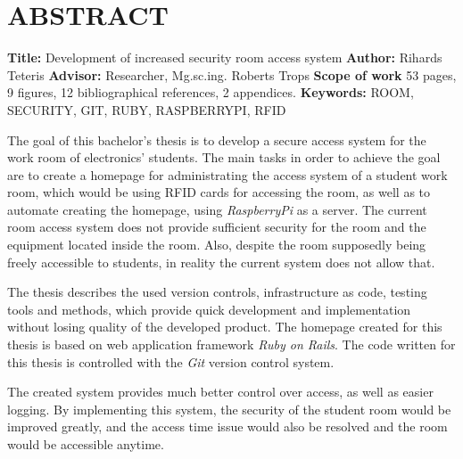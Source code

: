 \chapter*{ABSTRACT}
\noindent \textbf{Title:} Development of increased security room access system\newline
\textbf{Author:} Rihards Teteris\newline
\textbf{Advisor:} Researcher, Mg.sc.ing. Roberts Trops\newline
\textbf{Scope of work} 53 pages, 9 figures, 12 bibliographical references, 2 appendices.\newline
\textbf{Keywords:} ROOM, SECURITY, GIT, RUBY, RASPBERRYPI, RFID\newline

The goal of this bachelor's thesis is to develop a secure access system for the work room of  electronics' students.
The main tasks in order to achieve the goal are to create a homepage for administrating the access system of a student work room, which would be using RFID cards for accessing the room, as well as to automate creating the homepage, using \textit{RaspberryPi} as a server.
The current room access system does not provide sufficient security for the room and the equipment located inside the room. Also, despite the room supposedly being freely accessible to students, in reality the current system does not allow that.

The thesis describes the used version controls, infrastructure as code, testing tools and methods, which provide quick development and implementation without losing quality of the developed product. The homepage created for this thesis is based on web application framework \textit{Ruby on Rails}. The code written for this thesis is controlled with the \textit{Git} version control system.

The created system provides much better control over access, as well as easier logging. By implementing this system, the security of the student room would be improved greatly, and the access time issue would also be resolved and the room would be accessible anytime.
